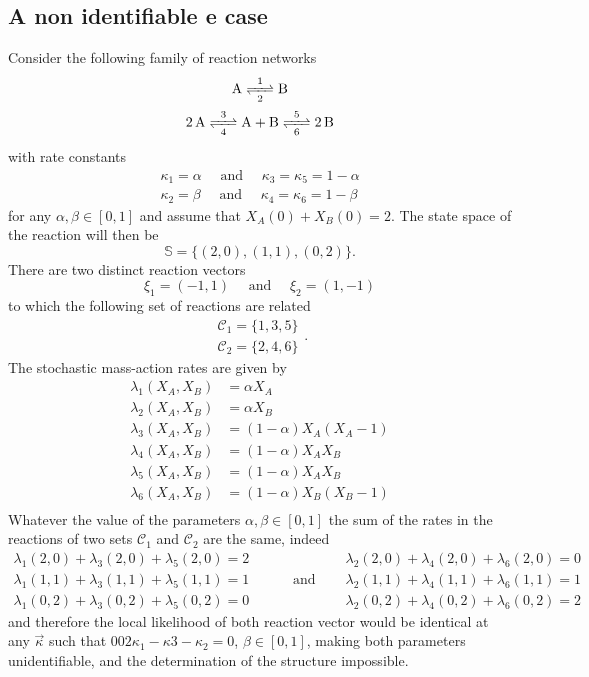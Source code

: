 \documentclass[pdflatex,sn-mathphys-num]{sn-jnl}%
\theoremstyle{thmstyleone}%
\theoremstyle{thmstyletwo}%
\theoremstyle{thmstylethree}%
\begin{document}
\begin{appendices}
\section{A non identifiable e case}
Consider the following family of reaction networks
\[\begin{gathered}\ce{A <=>[1][2] B}\label{non-id}\\
	\ce{2A <=>[3][4] A + B <=>[5][6] 2B}
\end{gathered}\] with rate constants \[\begin{aligned}\kappa_1=\alpha \quad\text{ and }\quad \kappa_3=\kappa_5=1-\alpha\\
\kappa_2=\beta \quad\text{ and }\quad \kappa_4=\kappa_6=1-\beta\end{aligned}
\]
for any $\alpha, \beta\in [0,1]$ and assume that $X_A(0)+X_B(0)=2$.
The state space of the reaction will then be
\[\mathbb{S}=\{(2,0), (1,1), (0,2)\}.\]
There are two distinct reaction vectors
\[\xi_1=(-1,1)\quad\text{ and }\quad\xi_2=(1,-1)\]
to which the following set of reactions are related
\[\begin{aligned}\mathcal{C}_1= \{1,3,5\}\\
\mathcal{C}_2= \{2,4,6\}
\end{aligned}.\]
The stochastic mass-action  rates are given by 
\begin{align}
\lambda_{1}(X_A, X_B)&=\alpha X_A\\
\lambda_{2}(X_A, X_B)&=\alpha X_B\\
\lambda_{3}(X_A, X_B) &= (1-\alpha) X_A (X_A-1) \\%
\lambda_{4}(X_A, X_B)&=(1-\alpha) X_A X_B\\
\lambda_{5}(X_A, X_B)&=(1-\alpha) X_A X_B\\
\lambda_{6}(X_A, X_B)&=(1-\alpha) X_B (X_B-1) \\%
\end{align}
Whatever the value of the parameters $\alpha, \beta\in [0,1]$ the sum of the rates in the reactions of two sets $\mathcal{C}_1$ and $\mathcal{C}_2$ are the same, indeed
\[\begin{aligned}\lambda_{1}(2, 0)+\lambda_{3}(2, 0)+\lambda_{5}(2, 0)=2 && \lambda_{2}(2, 0)+\lambda_{4}(2, 0)+\lambda_{6}(2, 0)=0 \\
 \lambda_{1}(1, 1)+\lambda_{3}(1, 1)+\lambda_{5}(1, 1)=1 &\qquad \text{ and }\quad &\lambda_{2}(1, 1)+\lambda_{4}(1, 1)+\lambda_{6}(1, 1)=1
 \\
 \lambda_{1}(0, 2) +\lambda_{3}(0,2) +\lambda_{5}(0, 2)=0 & &\lambda_{2}(0, 2) +\lambda_{4}(0,2) +\lambda_{6}(0, 2)=2
\end{aligned}\]
and therefore the local likelihood of both reaction vector would be identical at any $\vec \kappa$ such that $002\kappa_1-\kappa3-\kappa_2= 0$, $\beta\in [0,1]$, making both parameters unidentifiable, and the determination of the structure impossible.


\end{appendices}
\end{document}
